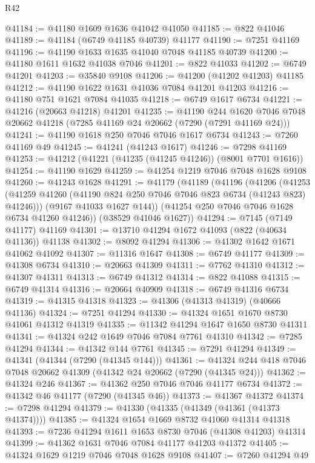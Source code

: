\begin{lexlean}{R42}
\begin{coremodule}
{@41184 := @41180 @1609 @1636 @41042 @41050
@41185 := @822 @41046
@41189 := @41184 (@6749 @41185 @40739) @41177
@41190 := @7251 @41169
@41196 := @41190 @1633 @1635 @41040 @7048 @41185 @40739
@41200 := @41180 @1611 @1632 @41038 @7046
@41201 := @822 @41033
@41202 := @6749 @41201
@41203 := @35840 @9108
@41206 := @41200 (@41202 @41203) @41185
@41212 := @41190 @1622 @1631 @41036 @7084 @41201 @41203
@41216 := @41180 @751 @1621 @7084 @41035
@41218 := @6749 @1617 @6734
@41221 := @41216 (@20663 @41218) @41201
@41235 := @41190
    @244
    @1620
    @7046
    @7048
    @20662
    @41218
    (@7285 @41169 @24 @20662 (@7290 (@7291 @41169 @24)))
@41241 := @41190 @1618 @250 @7046 @7046 @1617 @6734
@41243 := @7260 @41169 @49
@41245 := @41241 (@41243 @1617)
@41246 := @7298 @41169
@41253 := @41212 (@41221 (@41235 (@41245 @41246)) (@8001 @7701 @1616))
@41254 := @41190 @1629
@41259 := @41254 @1219 @7046 @7048 @1628 @9108
@41260 := @41243 @1628
@41291 := @41179
    (@41189
      (@41196
        (@41206
          (@41253 (@41259 @41260 (@41190 @824 @250 @7046 @7046 @823 @6734 (@41243 @823) @41246)))
          (@9167 @41033 @1627 @144))
        (@41254 @250 @7046 @7046 @1628 @6734 @41260 @41246))
      (@38529 @41046 @1627))
@41294 := @7145 (@7149 @41177) @41169
@41301 := @13710 @41294 @1672 @41093 (@822 (@40634 @41136)) @41138
@41302 := @8092 @41294
@41306 := @41302 @1642 @1671 @41062 @41092
@41307 := @11316 @1647
@41308 := @6749 @41177
@41309 := @41308 @6734
@41310 := @20663 @41309
@41311 := @7762 @41310
@41312 := @41307 @41311
@41313 := @6749 @41312
@41314 := @822 @41088
@41315 := @6749 @41314
@41316 := @20664 @40909
@41318 := @6749 @41316 @6734
@41319 := @41315 @41318
@41323 := @41306 (@41313 @41319) (@40666 @41136)
@41324 := @7251 @41294
@41330 := @41324 @1651 @1670 @8730 @41061 @41312 @41319
@41335 := @11342 @41294 @1647 @1650 @8730 @41311
@41341 := @41324 @242 @1649 @7046 @7084 @7761 @41310
@41342 := @7285 @41294
@41344 := @41342 @144 @7761
@41345 := @7291 @41294
@41349 := @41341 (@41344 (@7290 (@41345 @144)))
@41361 := @41324 @244 @418 @7046 @7048 @20662 @41309 (@41342 @24 @20662 (@7290 (@41345 @24)))
@41362 := @41324 @246
@41367 := @41362 @250 @7046 @7046 @41177 @6734
@41372 := @41342 @46 @41177 (@7290 (@41345 @46))
@41373 := @41367 @41372
@41374 := @7298 @41294
@41379 := @41330 (@41335 (@41349 (@41361 (@41373 @41374))))
@41385 := @41324 @1654 @1669 @8732 @41060 @41314 @41318
@41393 := @7236 @41294 @1611 @1653 @8730 @7046 (@41308 @41203) @41314
@41399 := @41362 @1631 @7046 @7084 @41177 @41203 @41372
@41405 := @41324 @1629 @1219 @7046 @7048 @1628 @9108
@41407 := @7260 @41294 @49
}
\end{coremodule}
\end{lexlean}
